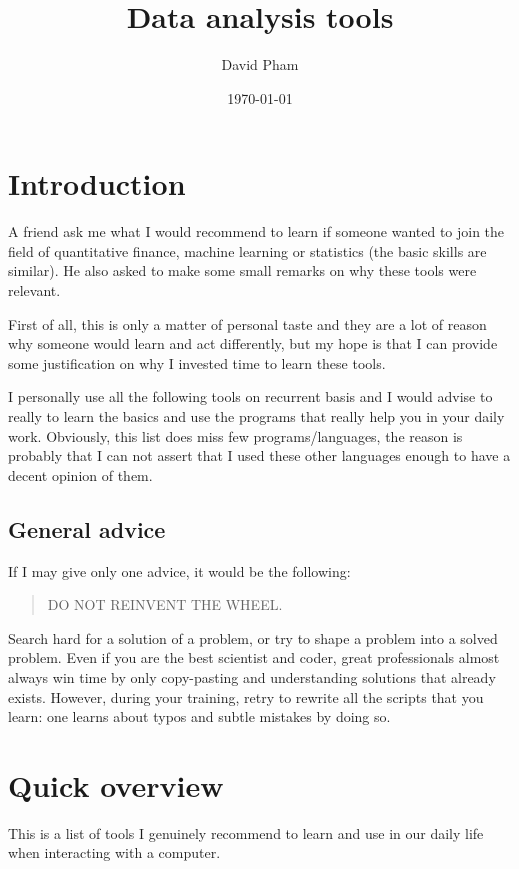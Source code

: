 \documentclass[11pt]{article}
\author{David Pham}
\date{\today}
\title{Data analysis tools}
\begin{document}
\maketitle
\tableofcontents


\section{Introduction}
\label{sec:org439afed}

A friend ask me what I would recommend to learn if someone wanted to join the
field of quantitative finance, machine learning or statistics (the basic
skills are similar). He also asked to make some small remarks on why these
tools were relevant.

First of all, this is only a matter of personal taste and they are a lot of
reason why someone would learn and act differently, but my hope is that I can
provide some justification on why I invested time to learn these tools.

I personally use all the following tools on recurrent basis and I would
advise to really to learn the basics and use the programs that really help
you in your daily work. Obviously, this list does miss few
programs/languages, the reason is probably that I can not assert that I used
these other languages enough to have a decent opinion of them.

\subsection{General advice}
\label{sec:orgd6d2830}
If I may give only one advice, it would be the following:

\begin{quote}
DO NOT REINVENT THE WHEEL.
\end{quote}

Search hard for a solution of a problem, or try to shape a problem into a
solved problem. Even if you are the best scientist and coder, great
professionals almost always win time by only copy-pasting and understanding
solutions that already exists.  However, during your training, retry to
rewrite all the scripts that you learn: one learns about typos and subtle
mistakes by doing so.

\section{Quick overview}
\label{sec:org00bf32d}
This is a list of tools I genuinely recommend to learn and use in our daily
life when interacting with a computer.
\end{document}
